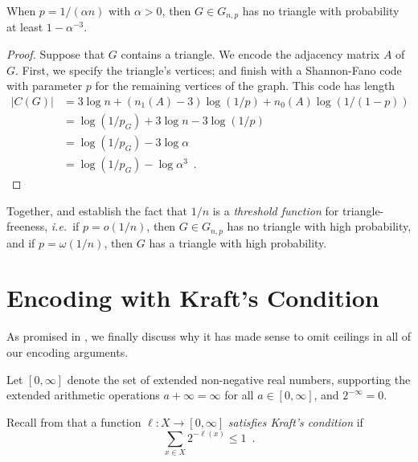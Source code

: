 \documentclass[prodmode,acmcsur]{acmsmall}
\begin{document}
\begin{thm}
  When $p = 1/(\alpha n)$ with $\alpha > 0$, then $G \in G_{n, p}$ has no triangle with
  probability at least $1 - \alpha^{-3}$.
\end{thm}
\begin{proof}
  Suppose that $G$ contains a triangle. We encode the adjacency matrix
  $A$ of $G$. First, we specify the triangle's vertices; and finish
  with a Shannon-Fano code with parameter $p$ for the remaining
  vertices of the graph. This code has length
  \begin{align*}
    |C(G)| &= 3 \log n + (n_1(A) - 3) \log (1/p) + n_0(A) \log (1/(1 - p)) \\
           &= \log (1/p_G) + 3 \log n - 3 \log (1/p) \\
           &= \log (1/p_G) - 3 \log \alpha \\
           &= \log (1/p_G) - \log \alpha^3 \enspace . %
  \end{align*}
\end{proof}

Together,  and  establish
the fact that $1/n$ is a \emph{threshold function} for
triangle-freeness, \emph{i.e.}~if $p = o(1/n)$, then $G \in G_{n, p}$
has no triangle with high probability, and if $p = \omega(1/n)$, then
$G$ has a triangle with high probability. 

\section{Encoding with Kraft's Condition}

As promised in , we finally discuss why it has made
sense to omit ceilings in all of our encoding arguments.

Let $[0, \infty]$ denote the set of extended non-negative real
numbers, supporting the extended arithmetic operations
$a + \infty = \infty$ for all $a \in [0, \infty]$, and
$2^{-\infty} = 0$.

  Recall from 
that a function $\ell : X \to [0, \infty]$ \emph{satisfies Kraft's
  condition} if
\[
  \sum_{x \in X} 2^{-\ell(x)} \leq 1 \enspace .
\]
\end{document}
